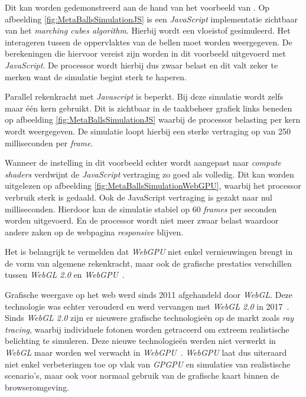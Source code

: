 \bigbreak{}

Dit kan worden gedemonstreerd aan de hand van het voorbeeld van \textcite{Jones2023}. Op afbeelding \ref{fig:MetaBallsSimulationJS} is een \textit{JavaScript} implementatie zichtbaar van het \textit{marching cubes algorithm}. Hierbij wordt een vloeistof gesimuleerd. Het interageren tussen de oppervlaktes van de bellen moet worden weergegeven. De berekeningen die hiervoor vereist zijn worden in dit voorbeeld uitgevoerd met \textit{JavaScript}. De processor wordt hierbij dus zwaar belast en dit valt zeker te merken want de simulatie begint sterk te haperen. 

\bigbreak{}

Parallel rekenkracht met \textit{Javascript} is beperkt. Bij deze simulatie wordt zelfs maar één kern gebruikt. Dit is zichtbaar in de taakbeheer grafiek links beneden op afbeelding \ref{fig:MetaBallsSimulationJS} waarbij de processor belasting per kern wordt weergegeven. De simulatie loopt hierbij een sterke vertraging op van 250 milliseconden per \textit{frame}.

\bigbreak{}

Wanneer de instelling in dit voorbeeld echter wordt aangepast naar \textit{compute shaders} verdwijnt de \textit{JavaScript} vertraging zo goed als volledig. Dit kan worden uitgelezen op afbeelding \ref{fig:MetaBallsSimulationWebGPU}, waarbij het processor verbruik sterk is gedaald. Ook de JavaScript vertraging is gezakt naar nul milliseconden. Hierdoor kan de simulatie stabiel op 60 \textit{frames} per seconden worden uitgevoerd. En de processor wordt niet meer zwaar belast waardoor andere zaken op de webpagina \textit{responsive} blijven.

\bigbreak{}

Het is belangrijk te vermelden dat \textit{WebGPU} niet enkel vernieuwingen brengt in de vorm van algemene rekenkracht, maar ook de grafische prestaties verschillen tussen \textit{WebGL 2.0} en \textit{WebGPU}~\autocite{Wallez2023}. 

\bigbreak{}
Grafische weergave op het web werd sinds 2011 afgehandeld door \textit{WebGL}. Deze technologie was echter verouderd en werd vervangen met \textit{WebGL 2.0} in 2017~\autocite{Surma2022}. Sinds \textit{WebGL 2.0} zijn er nieuwere grafische technologieën op de markt zoals \textit{ray tracing}, waarbij individuele fotonen worden getraceerd om extreem realistische belichting te simuleren. Deze nieuwe technologieën werden niet verwerkt in \textit{WebGL} maar worden wel verwacht in \textit{WebGPU}~\autocite{Surma2022}. \textit{WebGPU} laat dus uiteraard niet enkel verbeteringen toe op vlak van \textit{GPGPU} en simulaties van realistische scenario's, maar ook voor normaal gebruik van de grafische kaart binnen de browseromgeving.